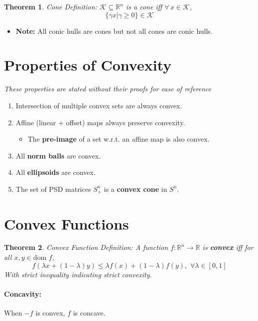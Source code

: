 \documentclass[a4paper,12pt]{report}
\newtheorem{theorem}{Theorem}
\begin{document}
\begin{theorem}{Cone Definition: }
$\mathcal K \subseteq \mathbb R^n$ is a cone iff $\forall \, x\in \mathcal K$,
\begin{equation}
\{\gamma x | \gamma \geq 0\} \in \mathcal K
\end{equation}
\end{theorem}
\begin{itemize}
\item \textbf{Note: } All conic hulls are cones but not all cones are conic hulls.
\end{itemize}


\section{Properties of Convexity}
\textit{These properties are stated without their proofs for ease of reference} 
\begin{enumerate}
\item Intersection of multiple convex sets are always convex.
\item Affine (linear + offset) maps always preserve convexity.
\begin{itemize}
\item The \textbf{pre-image} of a set w.r.t. an affine map is also convex. 
\end{itemize}
\item All \textbf{norm balls} are convex.
\item All \textbf{ellipsoids} are convex.
\item The set of PSD matrices $S_+^n$ is a \textbf{convex cone} in $S^n$. 
\end{enumerate}


\section{Convex Functions}

\begin{theorem}{Convex Function Definition: }
A function $f:\mathbb R^n \to \mathbb R$ is \textbf{convex} iff for all $x, y \in \text{dom }f$,
\begin{equation}
f(\lambda x + (1-\lambda) y) \leq \lambda f(x) + (1-\lambda) f(y), \,\, \forall \lambda\in [0,1]
\end{equation}
With strict inequality indicating strict convexity.
\end{theorem}

\paragraph{Concavity: } When $-f$ is convex, $f$ is concave.
\end{document}
